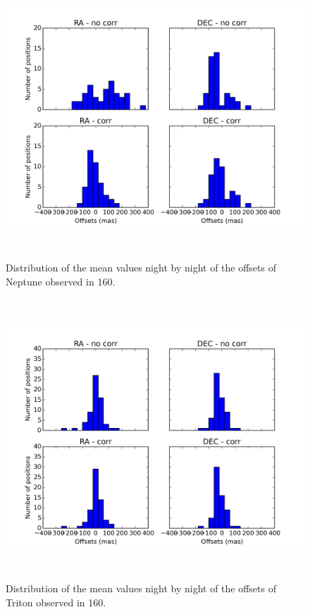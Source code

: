 \documentclass[12pt,a4paper]{report}
\begin{document}
\begin{figure}[H]
\centering
\includegraphics[height=10.5cm]{dist_Netuno_160_mean.png} 
\caption{Distribution of the mean values night by night of the offsets of Neptune observed in 160.}
\label{Fig:refraction-net-160-mean}
\end{figure}
\begin{figure}[H]
\centering
\includegraphics[height=10.5cm]{dist_Triton_160_mean.png} 
\caption{Distribution of the mean values night by night of the offsets of Triton observed in 160.}
\label{Fig:refraction-tri-160-mean}
\end{figure}
\end{document}
